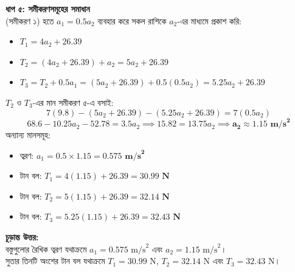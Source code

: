 \documentclass[12pt, a4paper]{article}
\begin{document}
\begin{tcolorbox}[solutionbox={সমাধান (Solution)}]
\vspace{0.5em}
\noindent
\textbf{ধাপ ৫: সমীকরণসমূহের সমাধান} \\
(সমীকরণ ১) হতে $a_1 = 0.5 a_2$ ব্যবহার করে সকল রাশিকে $a_2$-এর মাধ্যমে প্রকাশ করি:
\begin{itemize}[leftmargin=*, parsep=0.5ex]
    \item $T_1 = 4 a_2 + 26.39$
    \item $T_2 = (4 a_2 + 26.39) + a_2 = 5 a_2 + 26.39$
    \item $T_3 = T_2 + 0.5 a_1 = (5 a_2 + 26.39) + 0.5(0.5 a_2) = 5.25 a_2 + 26.39$
\end{itemize}
$T_2$ ও $T_3$-এর মান সমীকরণ ৫-এ বসাই:
\[ 7(9.8) - (5 a_2 + 26.39) - (5.25 a_2 + 26.39) = 7(0.5 a_2) \]
\[ 68.6 - 10.25 a_2 - 52.78 = 3.5 a_2 \implies 15.82 = 13.75 a_2 \implies \mathbf{a_2 \approx 1.15\text{ m/s}^2} \]
অন্যান্য মানসমূহ:
\begin{itemize}[leftmargin=*, parsep=0.5ex]
    \item ত্বরণ: $a_1 = 0.5 \times 1.15 = \mathbf{0.575\text{ m/s}^2}$
    \item টান বল: $T_1 = 4(1.15) + 26.39 = \mathbf{30.99\text{ N}}$
    \item টান বল: $T_2 = 5(1.15) + 26.39 = \mathbf{32.14\text{ N}}$
    \item টান বল: $T_3 = 5.25(1.15) + 26.39 = \mathbf{32.43\text{ N}}$
\end{itemize}

\vspace{1em}
\begin{tcolorbox}[answerbox]
\textbf{চূড়ান্ত উত্তর:} \\
বস্তুগুলোর রৈখিক ত্বরণ যথাক্রমে $a_1 = 0.575\text{ m/s}^2$ এবং $a_2 = 1.15\text{ m/s}^2$। \\
সুতার তিনটি অংশের টান বল যথাক্রমে $T_1 = 30.99\text{ N}$, $T_2 = 32.14\text{ N}$ এবং $T_3 = 32.43\text{ N}$।
\end{tcolorbox}
\end{tcolorbox}
\end{document}
